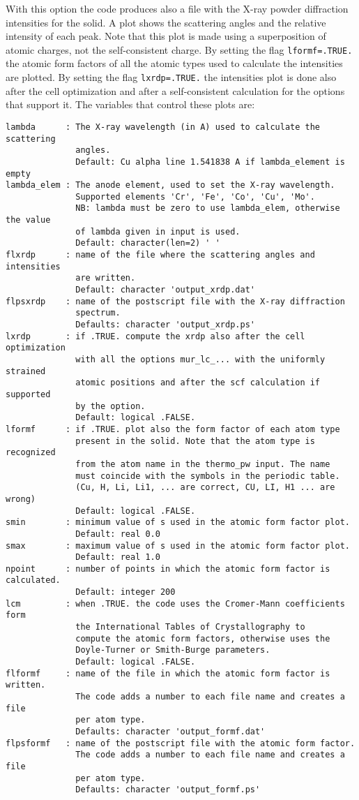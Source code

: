 \documentclass[12pt,a4paper]{article}
\begin{document}
With this option the code produces also a file with the X-ray
powder diffraction intensities for the solid. A plot shows the 
scattering angles and the relative intensity of each peak. Note 
that this plot is made using 
a superposition of atomic charges, not the self-consistent charge.
By setting the flag \texttt{lformf=.TRUE.} the atomic form factors of all 
the atomic types used to calculate the intensities are plotted. 
By setting the flag \texttt{lxrdp=.TRUE.} the intensities plot is done also 
after the cell optimization and after a self-consistent calculation 
for the options that support it.
The variables that control these plots are:
\begin{verbatim}
lambda      : The X-ray wavelength (in A) used to calculate the scattering 
              angles.
              Default: Cu alpha line 1.541838 A if lambda_element is empty
lambda_elem : The anode element, used to set the X-ray wavelength.
              Supported elements 'Cr', 'Fe', 'Co', 'Cu', 'Mo'.
              NB: lambda must be zero to use lambda_elem, otherwise the value
              of lambda given in input is used.
              Default: character(len=2) ' ' 
flxrdp      : name of the file where the scattering angles and intensities 
              are written.
              Default: character 'output_xrdp.dat'
flpsxrdp    : name of the postscript file with the X-ray diffraction
              spectrum.
              Defaults: character 'output_xrdp.ps'
lxrdp       : if .TRUE. compute the xrdp also after the cell optimization
              with all the options mur_lc_... with the uniformly strained
              atomic positions and after the scf calculation if supported
              by the option. 
              Default: logical .FALSE.
lformf      : if .TRUE. plot also the form factor of each atom type
              present in the solid. Note that the atom type is recognized
              from the atom name in the thermo_pw input. The name
              must coincide with the symbols in the periodic table. 
              (Cu, H, Li, Li1, ... are correct, CU, LI, H1 ... are wrong)
              Default: logical .FALSE.
smin        : minimum value of s used in the atomic form factor plot.
              Default: real 0.0
smax        : maximum value of s used in the atomic form factor plot.
              Default: real 1.0
npoint      : number of points in which the atomic form factor is calculated.
              Default: integer 200
lcm         : when .TRUE. the code uses the Cromer-Mann coefficients form
              the International Tables of Crystallography to
              compute the atomic form factors, otherwise uses the 
              Doyle-Turner or Smith-Burge parameters.
              Default: logical .FALSE.
flformf     : name of the file in which the atomic form factor is written. 
              The code adds a number to each file name and creates a file
              per atom type.
              Defaults: character 'output_formf.dat'
flpsformf   : name of the postscript file with the atomic form factor.  
              The code adds a number to each file name and creates a file
              per atom type.
              Defaults: character 'output_formf.ps'
\end{verbatim}
\end{document}
